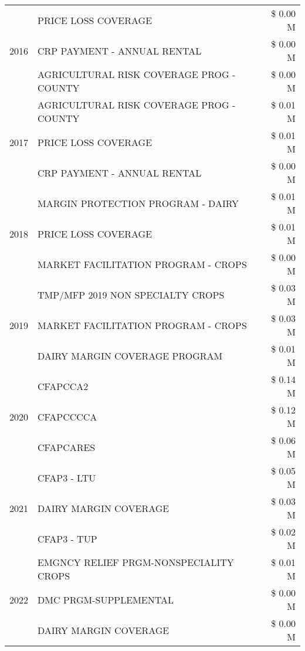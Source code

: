 \begin{tabular}{llr}
\multirow[t]{3}{*}{2016} & PRICE LOSS COVERAGE & \$ 0.00 M \\
 & CRP PAYMENT - ANNUAL RENTAL & \$ 0.00 M \\
 & AGRICULTURAL RISK COVERAGE PROG - COUNTY & \$ 0.00 M \\
\cline{1-3}
\multirow[t]{3}{*}{2017} & AGRICULTURAL RISK COVERAGE PROG - COUNTY & \$ 0.01 M \\
 & PRICE LOSS COVERAGE & \$ 0.01 M \\
 & CRP PAYMENT - ANNUAL RENTAL & \$ 0.00 M \\
\cline{1-3}
\multirow[t]{3}{*}{2018} & MARGIN PROTECTION PROGRAM - DAIRY & \$ 0.01 M \\
 & PRICE LOSS COVERAGE & \$ 0.01 M \\
 & MARKET FACILITATION PROGRAM - CROPS & \$ 0.00 M \\
\cline{1-3}
\multirow[t]{3}{*}{2019} & TMP/MFP 2019 NON SPECIALTY CROPS & \$ 0.03 M \\
 & MARKET FACILITATION PROGRAM - CROPS & \$ 0.03 M \\
 & DAIRY MARGIN COVERAGE PROGRAM & \$ 0.01 M \\
\cline{1-3}
\multirow[t]{3}{*}{2020} & CFAPCCA2 & \$ 0.14 M \\
 & CFAPCCCCA & \$ 0.12 M \\
 & CFAPCARES & \$ 0.06 M \\
\cline{1-3}
\multirow[t]{3}{*}{2021} & CFAP3 - LTU & \$ 0.05 M \\
 & DAIRY MARGIN COVERAGE & \$ 0.03 M \\
 & CFAP3 - TUP & \$ 0.02 M \\
\cline{1-3}
\multirow[t]{3}{*}{2022} & EMGNCY RELIEF PRGM-NONSPECIALITY CROPS & \$ 0.01 M \\
 & DMC PRGM-SUPPLEMENTAL & \$ 0.00 M \\
 & DAIRY MARGIN COVERAGE & \$ 0.00 M \\
\cline{1-3}
\bottomrule
\end{tabular}
